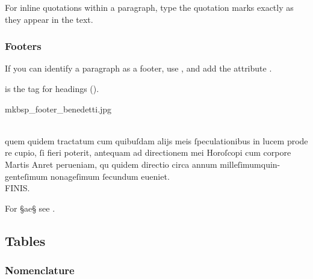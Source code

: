 \begin{note}
For inline quotations within a paragraph, type the quotation marks exactly as they appear in the text.
\end{note}

\subsubsection{Footers}
\label{footers}

\begin{mainruleLessImportant}
If you can identify a paragraph as a footer, use , and add the attribute .
\end{mainruleLessImportant}

\begin{crossref}
 is the tag for headings ().
\end{crossref}

\begin{sampleImage}{mkbsp_footer_benedetti.jpg}
\begin{typeLatin}
 \someText \\
quem quidem tractatum cum quibuſdam alijs meis ſpeculationibus in lucem prode \\
re cupio, ſi fieri poterit, antequam ad directionem mei Horoſcopi cum corpore \\
Martis Anret perueniam, qu quidem directio circa annum milleſimum\lwr quin- \\
genteſimum nonageſimum ſecundum eueniet.\\
FINIS.
\end{typeLatin}

\end{sampleImage}

\begin{crossref}
For §{ae}§ see .
\end{crossref}


\tocspace
\subsection{Tables}
\label{section tables}

\subsubsection{Nomenclature}
\label{section tables overview}

